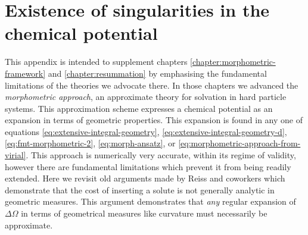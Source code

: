 \documentclass[11pt,twoside]{report}
\begin{document}
\chapter{Existence of singularities in the chemical potential}
\label{appendix:spt-singularities}

This appendix is intended to supplement chapters \ref{chapter:morphometric-framework} and \ref{chapter:resummation} by emphasising the fundamental limitations of the theories we advocate there.
In those chapters we advanced the \emph{morphometric approach}, an approximate theory for solvation in hard particle systems.
This approximation scheme expresses a chemical potential as an expansion in terms of geometric properties.
This expansion is found in any one of equations \eqref{eq:extensive-integral-geometry}, \eqref{eq:extensive-integral-geometry-d}, \eqref{eq:fmt-morphometric-2}, \eqref{eq:morph-ansatz}, or \eqref{eq:morphometric-approach-from-virial}.
This approach is numerically very accurate, within its regime of validity, however there are fundamental limitations which prevent it from being readily extended.
Here we revisit old arguments made by Reiss and coworkers \cite{ReissJCP1959,ReissJCP1960} which demonstrate that the cost of inserting a solute is not generally analytic in geometric measures.
This argument demonstrates that \emph{any} regular expansion of $\Delta \Omega$ in terms of geometrical measures like curvature must necessarily be approximate.
\end{document}
